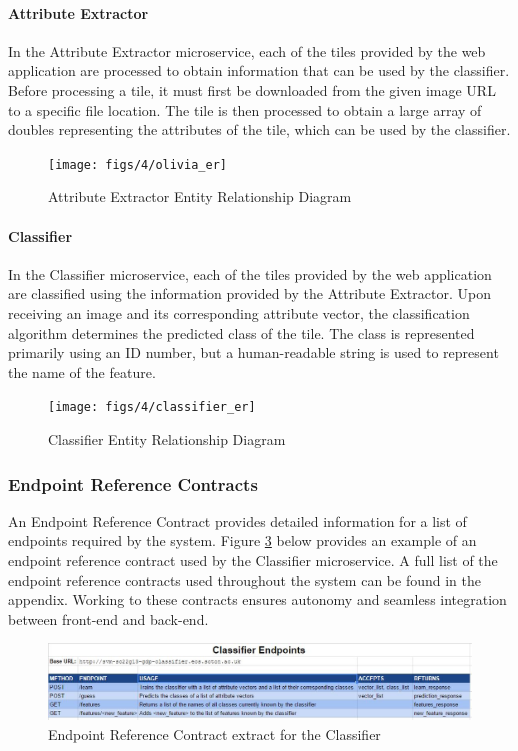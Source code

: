\paragraph{Attribute Extractor\\}
In the Attribute Extractor microservice, each of the tiles provided by the web application are processed to obtain information that can be used by the classifier. Before processing a tile, it must first be downloaded from the given image URL to a specific file location. The tile is then processed to obtain a large array of doubles representing the attributes of the tile, which can be used by the classifier.
\begin{figure}[H]
    \centering
    \texttt{[image: figs/4/olivia\_er]}
    \caption{Attribute Extractor Entity Relationship Diagram}
    \label{fig:olivia_er}
\end{figure}
\paragraph{Classifier\\}
In the Classifier microservice, each of the tiles provided by the web application are classified using the information provided by the Attribute Extractor. Upon receiving an image and its corresponding attribute vector, the classification algorithm determines the predicted class of the tile. The class is represented primarily using an ID number, but a human-readable string is used to represent the name of the feature. 
\begin{figure}[H]
    \centering
    \texttt{[image: figs/4/classifier\_er]}
    \caption{Classifier Entity Relationship Diagram
}
    \label{fig:classifier_er}
\end{figure}
\subsubsection{Endpoint Reference Contracts}
An Endpoint Reference Contract provides detailed information for a list of endpoints required by the system. Figure \ref{fig:classifier_endpoints} below provides an example of an endpoint reference contract used by the Classifier microservice. A full list of the endpoint reference contracts used throughout the system can be found in the appendix. Working to these contracts ensures autonomy and seamless integration between front-end and back-end. 
\begin{figure}[H]
    \centering
    \includegraphics[width=\textwidth]{figs/4/classifier_endpoints}
    \caption{ Endpoint Reference Contract extract for the Classifier}
    \label{fig:classifier_endpoints}
\end{figure}